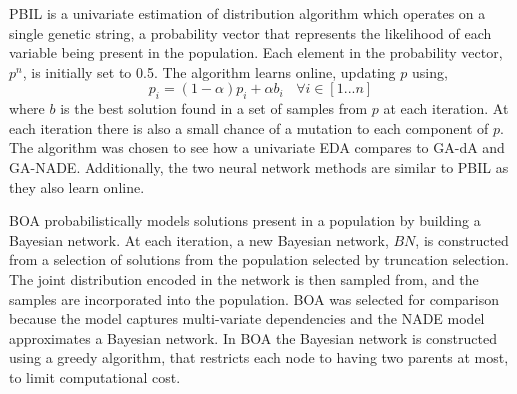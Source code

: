 \documentclass[twoside]{article}
\begin{document}
PBIL is a univariate estimation of distribution algorithm which operates on a single genetic string, a probability vector that represents the likelihood of each variable being present in the population. Each element in the probability vector, \(p^n\),  is initially set to 0.5. The algorithm learns online, updating \(p\) using,
\[
p_i = (1-\alpha)p_i + \alpha b_i \ \ \ \ \forall{i \in{[1 ... n]}}
\]
where \(b\) is the best solution found in a set of samples from \(p\) at each iteration. At each iteration there is also a small chance of a mutation to each component of $p$. The algorithm was chosen to see how a univariate EDA compares to GA-dA and GA-NADE. Additionally, the two neural network methods are similar to PBIL as they also learn online.

BOA probabilistically models solutions present in a population by building a Bayesian network. At each iteration, a new Bayesian network, \(BN\), is constructed from a selection of solutions from the population selected by truncation selection. The joint distribution encoded in the network is then sampled from, and the samples are incorporated into the population. BOA was selected for comparison because the model captures multi-variate dependencies and the NADE model approximates a Bayesian network. In BOA the Bayesian network is constructed using a greedy algorithm, that restricts each node to having two parents at most, to limit computational cost.
\end{document}
